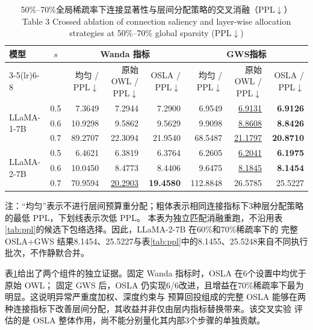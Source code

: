 \documentclass[UTF8,fontset=fandol]{ctexart}
\renewcommand{\arraystretch}{1.08}
\newcommand{\gws}{\textsc{GWS}}
\newcommand{\best}[1]{\textbf{#1}}
\newcommand{\second}[1]{\underline{#1}}
\begin{document}
\begin{table}[!htbp]
\centering
\caption{50\%--70\%全局稀疏率下连接显著性与层间分配策略的交叉消融（PPL$\downarrow$）\\
Table 3 Crossed ablation of connection saliency and layer-wise allocation strategies at 50\%--70\% global sparsity (PPL$\downarrow$)}
\label{tab:ablation}
\scriptsize
\setlength{\tabcolsep}{4.2pt}
\renewcommand{\arraystretch}{0.98}
\begin{tabular*}{0.92\textwidth}{@{\extracolsep{\fill}}lcrrrrrr@{}}
\toprule
\multirow{2}{*}{模型} & \multirow{2}{*}{$s$} &
\multicolumn{3}{c}{Wanda 指标} & \multicolumn{3}{c}{\gws 指标} \\
\cmidrule(lr){3-5}\cmidrule(lr){6-8}
 & & 均匀 / PPL$\downarrow$ & 原始 OWL / PPL$\downarrow$ & OSLA / PPL$\downarrow$ & 均匀 / PPL$\downarrow$ & 原始 OWL / PPL$\downarrow$ & OSLA / PPL$\downarrow$ \\
\midrule
\multirow{3}{*}{LLaMA-1-7B}
 & 0.5 & 7.3649 & 7.2944 & 7.2900 & 6.9549 & \second{6.9131} & \best{6.9126} \\
 & 0.6 & 10.9298 & 9.5862 & 9.5629 & 9.9098 & \second{8.8608} & \best{8.8426} \\
 & 0.7 & 89.2707 & 22.3094 & 21.9540 & 68.5487 & \second{21.1797} & \best{20.8710} \\
\midrule
\multirow{3}{*}{LLaMA-2-7B}
 & 0.5 & 6.4621 & 6.3819 & 6.3764 & 6.2605 & \second{6.2041} & \best{6.1975} \\
 & 0.6 & 10.0450 & 8.4773 & 8.4406 & 9.6475 & \second{8.1845} & \best{8.1454} \\
 & 0.7 & 70.9594 & \second{20.2903} & \best{19.4580} & 112.8848 & 26.5785 & 25.5227 \\
\bottomrule
\end{tabular*}
\vspace{2pt}
\parbox{0.92\textwidth}{\scriptsize
注：“均匀”表示不进行层间预算重分配；粗体表示相同连接指标下3种层分配策略的最低 PPL，下划线表示次低 PPL。
本表为独立匹配消融重跑，不沿用表\ref{tab:ppl}的候选下包络选择。因此，LLaMA-2-7B 在60\%和70\%稀疏率下的
完整 OSLA+GWS 结果8.1454、25.5227与表\ref{tab:ppl}中的8.1455、25.5248来自不同执行批次，不作静默合并。}
\end{table}

表\ref{tab:ablation}给出了两个组件的独立证据。固定 Wanda 指标时，OSLA 在6个设置中均优于原始 OWL；
固定 GWS 后，OSLA 仍实现6/6改进，且增益在70\%稀疏率下最为明显。这说明异常严重度加权、深度约束与
预算回投组成的完整 OSLA 能够在两种连接指标下改善层间分配，其收益并非仅由层内指标替换带来。该交叉实验
评估的是 OSLA 整体作用，尚不能分别量化其内部3个步骤的单独贡献。
\end{document}
